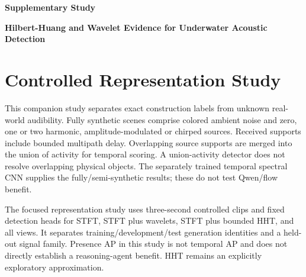 \documentclass[11pt,letterpaper]{article}
\newcommand{\drafttitle}[1]{\begin{center}\sffamily\bfseries\fontsize{16}{19}\selectfont #1\end{center}}
\begin{document}
\fontsize{11}{13}\selectfont

\nocite{portia,huang1998,flowmatching}

\drafttitle{Supplementary Study}

\begin{center}\sffamily\bfseries Hilbert-Huang and Wavelet Evidence for Underwater Acoustic Detection\end{center}

\section{Controlled Representation Study}

This companion study separates exact construction labels from unknown real-world audibility. Fully synthetic scenes comprise colored ambient noise and zero, one or two harmonic, amplitude-modulated or chirped sources. Received supports include bounded multipath delay. Overlapping source supports are merged into the union of activity for temporal scoring. A union-activity detector does not resolve overlapping physical objects. The separately trained temporal spectral CNN supplies the fully/semi-synthetic results; these do not test Qwen/flow benefit.\par

The focused representation study uses three-second controlled clips and fixed detection heads for STFT, STFT plus wavelets, STFT plus bounded HHT, and all views. It separates training/development/test generation identities and a held-out signal family. Presence AP in this study is not temporal AP and does not directly establish a reasoning-agent benefit. HHT remains an explicitly exploratory approximation.\par
\end{document}
